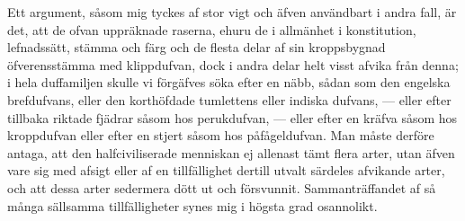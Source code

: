 Ett argument, såsom mig tyckes af stor vigt och äfven användbart i andra fall, är det, att de ofvan uppräknade raserna, ehuru de i allmänhet i konstitution, lefnadssätt, stämma och färg och de flesta delar af sin kroppsbygnad öfverensstämma med klippdufvan, dock i andra delar helt visst afvika från denna; i hela duffamiljen skulle vi förgäfves söka efter en näbb, sådan som den engelska brefdufvans, eller den korthöfdade tumlettens eller indiska dufvans, — eller efter tillbaka riktade fjädrar såsom hos perukdufvan, — eller efter en kräfva såsom hos kroppdufvan eller efter en stjert såsom hos påfågeldufvan. Man måste derföre antaga, att den halfciviliserade menniskan ej allenast tämt flera arter, utan äfven vare sig med afsigt eller af en tillfällighet dertill utvalt särdeles afvikande arter, och att dessa arter sedermera dött ut och försvunnit. Sammanträffandet af så många sällsamma tillfälligheter synes mig i högsta grad osannolikt.

